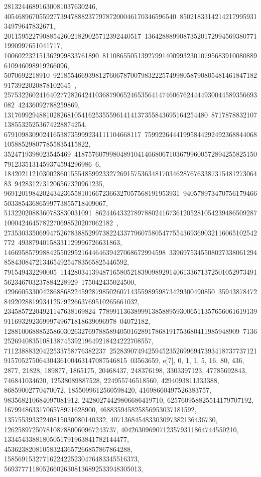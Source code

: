 {{{28132446891630081037630246, 4054689670559277394788823779787200046170346596540\
850218331421421799593134979647832671, 201159522790885426021829025712392440517\
136428889908735201729945693807711990997651041717, 100602232151362999833761890\
81108655051392799140099323010795683910080889610946098919266096, 5070692218910\
92185546693981276067870079832225749980587908054814618471829173922020878102645\
, 257532260241640277282642410368790652465356414746067624444930044589356693082\
42436092788259869, 1317699294881028268105416253555961414137355843695164254480\
871787883210713855325253674228874254, 679109830902416538735999234111104668117\
75992264441995844292492368844068105885298077855835415822, 3524719398023545469\
41875760799804891041466806710367996005728942558251507912335131459374594296986\
6, 18420211210300286015554859923327269157536348170346287676338731548127306483\
9428312731206567320961235, 96912019842024342365581016672366327057568191953931\
94057897347075617946650338543686599773855718409067, 5132202088360783830031091\
86244643327897880241673612052810542394865092871000424645782270698520207062182\
, 273530335069947526783885299738224337796075805477554369369032116065102542772\
49387940158331129996726631863, 1466958579988425502952164464639427068672994598\
339697534550802733806129485843084721346549254783565825446592, 791549432290005\
11428034139487165805218390989291406133671372501052973491562346703237884228929\
175042435024500, 429660533004286886822459287985026071435598959873429300490850\
3594387847284920288199341257922663769510265661032, 23458572204921147638169824\
77899113638999138588959300651135765606161913991169329236999749671818639096978\
04072182, 1288100688852586030263276978858940501628917868191753680411985948909\
7136252694083510813874539219649218424222708557, 71123888320422533758776382237\
25283907494259452352699694739341873773712191570527506430436100463147087546815\
03563659}}, {e[7], {0, 1, 1, 5, 16, 80, 436, 2877, 21828, 189877, 1865175, 
   20468437, 248376198, 3303397123, 47785692843, 746841034620, 
   12538089887528, 224955746518560, 4294093811333388, 86859002770470072, 
   1855099612560598420, 41698660497526383757, 983568210684097081912, 
   24280274429806686419710, 625760958825514179707192, 
   16799486331706578971628900, 468835945825856953037181592, 
   13575539332240815030080140332, 407136845483303097382136436730, 
   12625897250781087880060967243737, 404263096907123579311864744550210, 
   13345433881805051791963841782144477, 453623820810583243657266857867864288, 
   15856915327716224225230476483345516373, 
   569377711805266026308136892533948305013, 
}}}
